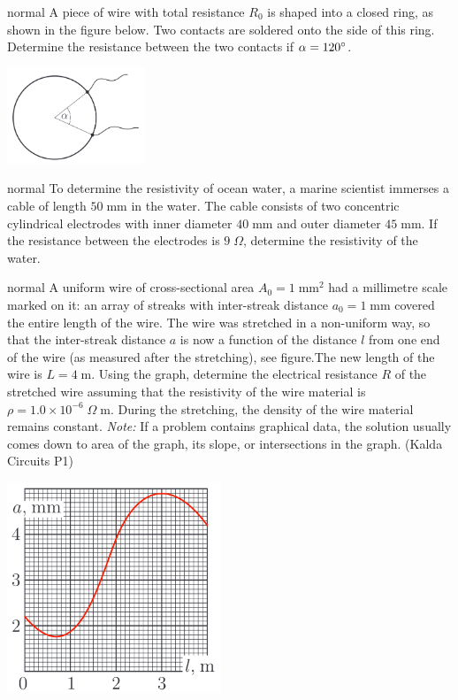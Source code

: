 \hypertarget{P5}{}
\begin{solution}{normal} %
A piece of wire with total resistance $R_0$ is shaped into a closed ring, as shown in the figure below. Two contacts are soldered onto the side of this ring. Determine the resistance between the two contacts if $\alpha=120\degree$.
\begin{center}
    \includegraphics[width=0.31\textwidth]{S1 Figures/S1-5.png}
\end{center}
\end{solution}

\hypertarget{P6}{}
\begin{solution}{normal} %
To determine the resistivity of ocean water, a marine scientist immerses a cable of length $50\;\text{mm}$ in the water. The cable consists of two concentric cylindrical electrodes with inner diameter $40\;\text{mm}$ and outer diameter $45\;\text{mm}$. If the resistance between the electrodes is $9\;\Omega$, determine the resistivity of the water.
\end{solution}

\hypertarget{P7}{}
\begin{solution}{normal} %
A uniform wire of cross-sectional area $A_0=1\;\text{mm}^2$ had a millimetre scale marked on it: an array of streaks with inter-streak distance $a_0=1\;\text{mm}$ covered the entire length of the wire. The wire was stretched in a non-uniform way, so that the inter-streak distance $a$ is now a function of the distance $l$ from one end of the wire (as measured after the stretching), see figure.The new length of the wire is $L=4\;\text{m}$. Using the graph, determine the electrical resistance $R$ of the stretched wire assuming that the resistivity of the wire material is $\rho=1.0\times10^{-6}\;\Omega\;\text{m}$. During the stretching, the density of the wire material remains constant. \textit{Note:} If a problem contains graphical data, the solution usually comes down to area of the graph, its slope, or intersections in the graph. (Kalda Circuits P1)
\begin{center}
    \includegraphics[width=0.48\textwidth]{S1 Figures/S1-7.png}
\end{center}
\end{solution}

